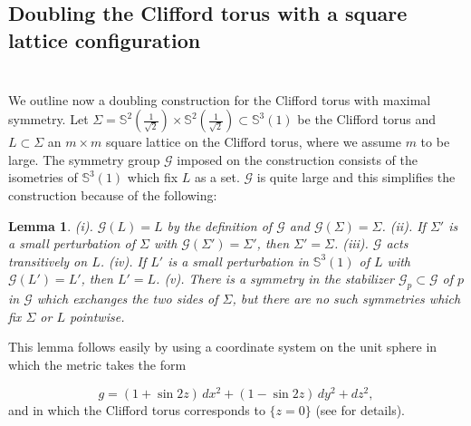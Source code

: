 \documentclass[12pt,namelimits,sumlimits]{amsart}
\newtheorem{lemma}[theorem]{Lemma}
\theoremstyle{remark}
\numberwithin{equation}{section}
\begin{document}
\subsection*{Doubling the Clifford torus with a square lattice configuration \cite{kapouleas:clifford}}
$\phantom{ab}$
\nopagebreak

We outline now a doubling construction for the Clifford torus with maximal symmetry.
Let $\Sigma={\mathbb{S}}^2(\frac1{\sqrt2})\times{\mathbb{S}}^2(\frac1{\sqrt2})\subset{\mathbb{S}}^3(1)$
be the Clifford torus and $L\subset\Sigma$ an $m\times m$ square lattice on the Clifford torus,
where we assume $m$ to be large.
The symmetry group ${{\mathscr{G}}}$ imposed on the construction consists of the isometries of ${\mathbb{S}}^3(1)$
which fix $L$ as a set.
${{\mathscr{G}}}$ is quite large and this simplifies the construction because of the following:
\addtocounter{equation}{1}
\begin{lemma}
\label{Lgroup}
(i). 
${{\mathscr{G}}}(L)=L$ by the definition of ${{\mathscr{G}}}$
and ${{\mathscr{G}}}(\Sigma)=\Sigma$.
\newline
(ii).
If $\Sigma'$ is a small perturbation 
of $\Sigma$ with 
${{\mathscr{G}}}(\Sigma')=\Sigma'$, then $\Sigma'=\Sigma$.
\newline
(iii). ${{\mathscr{G}}}$ acts transitively on $L$.
\newline
(iv). 
If $L'$ is a small perturbation in ${\mathbb{S}}^3(1)$ of $L$ with 
${{\mathscr{G}}}(L')=L'$, then $L'=L$.
\newline
(v). There is a symmetry in the stabilizer ${{\mathscr{G}}}_p\subset {{\mathscr{G}}}$ of $p$ in ${{\mathscr{G}}}$
which exchanges the two sides of $\Sigma$,
but there are no such symmetries which fix $\Sigma$ or $L$ pointwise.
\end{lemma}

This lemma follows easily by using a coordinate system on the unit sphere in which the metric takes the form
\addtocounter{theorem}{1}
\begin{equation}
\label{EPhig}
    g = (1+\sin2  z)\,d  x^2 + (1-\sin2  z)\,d  y^2 + d  z^2,
\end{equation}
and in which the Clifford torus corresponds to $\{z=0\}$ (see \cite{kapouleas:clifford} for details).
\end{document}
